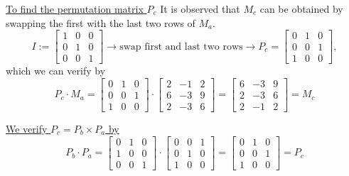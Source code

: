  \underline{To find the permutation matrix $P_c$}  It is observed that $M_c$ can be obtained by swapping the first with the last two rows of $M_a$. \\
 $$I:=\left[ \begin{array}{rrr} 1 & 0 & 0 \\ 0 & 1 & 0 \\ 0 & 0 & 1\end{array} \right] \rightarrow \text{swap first and last two rows} \rightarrow P_c = \left[ \begin{array}{rrr} 0 & 1 & 0 \\ 0 & 0 & 1 \\ 1 & 0 & 0\end{array} \right], $$
 which we can verify by \\
 $$P_c \cdot M_a = \left[ \begin{array}{rrr} 0 & 1 & 0 \\ 0 & 0 & 1 \\ 1 & 0 & 0\end{array} \right] \cdot \left[ \begin{array}{rrr}2 & -1 & 2 \\ 6 & -3 & 9 \\ 2 & -3 & 6\end{array} \right] = \left[ \begin{array}{rrr}6 & -3 & 9 \\ 2 & -3 & 6 \\ 2 & -1 & 2\end{array} \right] = M_c$$
  
  \underline{We verify $P_c = P_b \times P_a$ by} \\
 $$P_b \cdot P_a = \left[ \begin{array}{rrr} 0 & 1 & 0 \\ 1 & 0 & 0 \\ 0 & 0 & 1\end{array} \right] \cdot \left[ \begin{array}{rrr}0 & 0 & 1 \\ 0 & 1 & 0 \\ 1 & 0 & 0\end{array} \right] = \left[ \begin{array}{rrr}0 & 1 & 0 \\ 0 & 0 & 1 \\ 1 & 0 & 0\end{array} \right] = P_c$$
 \Qed
 
 \vspace*{.5cm}
 
